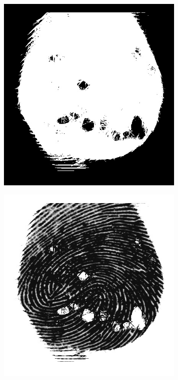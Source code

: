 \documentclass{beamer}
\begin{document}
{\begin{figure}[!ht]
\begin{subfigure}[ht]{0.15\textwidth}
        \end{subfigure}
        \qquad
        \begin{subfigure}[ht]{0.15\textwidth}
            \includegraphics[width=\textwidth]{fingerprints/2000Db3a/1_1_mask.jpg}
        \end{subfigure}
        \qquad
        \begin{subfigure}[ht]{0.15\textwidth}
            \includegraphics[width=\textwidth]{fingerprints/2000Db3a/1_1_filtered.jpg}

\end{subfigure}
\end{figure}}
\end{document}
